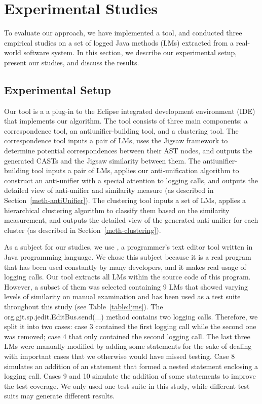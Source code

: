 
\chapter{Experimental Studies}  \label{studies}
To evaluate our approach, we have implemented a tool, and conducted three empirical studies on a set of logged Java methods (LMs) extracted from a real-world software system. In this section, we describe our experimental setup, present our studies, and discuss the results.

\section{Experimental Setup}  \label{experimental_setup}
Our tool is a a plug-in to the Eclipse integrated development environment (IDE) that implements our algorithm. The tool consists of three main components: a correspondence tool, an antiunifier-building tool, and a clustering tool. The correspondence tool inputs a pair of LMs, uses the Jigsaw framework to determine potential correspondences between their AST nodes, and outputs the generated CASTs and the Jigsaw similarity between them. The antiunifier-building tool inputs a pair of LMs, applies our anti-unification algorithm to construct an anti-unifier with a special attention to logging calls, and outputs the detailed view of anti-unifier and similarity measure (as described in Section~\ref{meth-antiUnifier}). The clustering tool inputs a set of LMs, applies a hierarchical clustering algorithm to classify them based on the similarity measurement, and outputs the detailed view of the generated anti-unifier for each cluster (as described in Section~\ref{meth-clustering}).

As a subject for our studies, we use , a programmer’s text editor tool written in Java programming language. We chose this subject because it is a real program that has been used constantly by many developers, and it makes real usage of logging calls.
Our tool extracts all LMs within the source code of this program. However, a subset of them was selected containing 9 LMs that showed varying levels of similarity on manual examination and has been used as a test suite throughout this study (see Table~\ref{table:ljms}). The org.gjt.sp.jedit.EditBus.send(...) method contains two logging calls. Therefore, we split it into two cases: case 3 contained the first logging call while the second one was removed; case 4 that only contained the second logging call. The last three LMs were manually modified by adding some statements for the sake of dealing with important cases that we otherwise would have missed testing. Case 8 simulates an addition of an statement that formed a nested statement enclosing a logging call. Cases 9 and 10 simulate the addition of some statements to improve the test coverage.
We only used one test suite in this study, while different test suits may generate different results.


